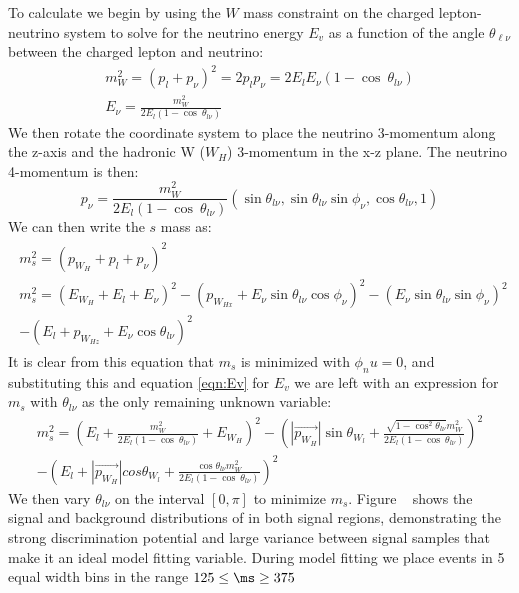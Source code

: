 To calculate \minms we begin by using the $W$ mass constraint on the charged lepton-neutrino system to solve for the neutrino energy $E_v$ as a function of the angle $\theta_{\ell\nu}$ between the charged lepton and neutrino:
\begin{equation}
	\begin{gathered}
    \label{eqn:Ev}
		m_W^2 = (p_l + p_{\nu})^2 = 2p_lp_{\nu} = 2E_lE_{\nu}(1 - \cos\ \theta_{l\nu})\\
		E_{\nu} = \frac{m_W^2}{2E_l(1 - \cos\ \theta_{l\nu})}
	\end{gathered}
\end{equation}
We then rotate the coordinate system to place the neutrino 3-momentum along the z-axis and the hadronic W ($W_H$) 3-momentum in the x-z plane. The neutrino 4-momentum is then:
\begin{equation}
	p_{\nu} = \frac{m_W^2}{2E_l(1 - \cos\ \theta_{l\nu})}(\sin \theta_{l\nu}, \sin \theta_{l\nu}\sin \phi_{\nu}, \cos \theta_{l\nu}, 1)
\end{equation}
We can then write the $s$ mass as:
\begin{multline}
\label{eqn:m_s}
	\begin{gathered}
		m_s^2 = (p_{W_H} + p_l + p_{\nu})^2\\
		m_s^2 = (E_{W_H} + E_l + E_{\nu})^2 - (p_{W_{Hx}} + E_{\nu}\sin \theta_{l\nu}\cos \phi_{\nu})^2 - (E_{\nu}\sin \theta_{l\nu}\sin \phi_{\nu})^2 \\- (E_l + p_{W_{Hz}} + E_{\nu}\cos \theta_{l\nu})^2
	\end{gathered}
\end{multline}
It is clear from this equation that $m_s$ is minimized with $\phi_nu = 0$, and substituting this and equation \ref{eqn:Ev} for $E_v$ we are left with an expression for $m_s$ with $\theta_{l\nu}$ as the only remaining unknown variable:
\begin{multline}
m_s^2 = \left(E_l + \frac{m_W^2}{2E_l(1 - \cos\ \theta_{l\nu})} + E_{W_H}\right)^2 - \left(|\vec{p_{W_H}}|\sin \theta_{W_l} + \frac{\sqrt{1 - \cos^2 \theta_{l\nu}}m_W^2}{2E_l(1 - \cos\ \theta_{l\nu})}\right)^2 \\- \left(E_l + |\vec{p_{W_H}}|cos \theta_{W_l} + \frac{\cos \theta_{l\nu}m_W^2}{2E_l(1 - \cos\ \theta_{l\nu})}\right)^2
\end{multline}
We then vary $\theta_{l\nu}$ on the interval $[0,\pi]$ to minimize $m_s$.
Figure ~ shows the signal and background distributions of \minms in both signal regions, demonstrating the strong discrimination potential and large variance between signal samples that make it an ideal model fitting variable. During model fitting we place events in 5 equal width bins in the range $125 \leq \ms \geq 375$

